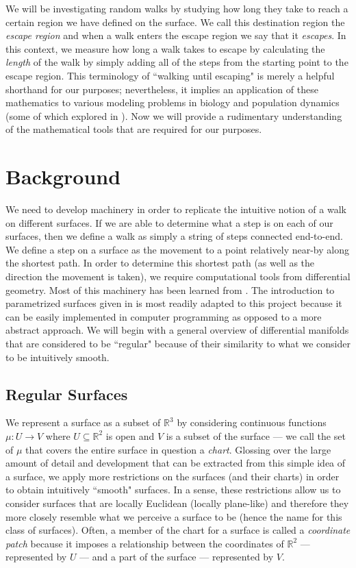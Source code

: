 \documentclass[12pt]{article}
\newcommand{\R}{\mathbb{R}}
\begin{document}
	We will be investigating random walks by studying how long they take to reach a certain region we have defined on the surface.
	We call this destination region the \emph{escape region} and when a walk enters the escape region we say that it \emph{escapes}.
	In this context, we measure how long a walk takes to escape by calculating the \emph{length} of the walk by simply adding all of the steps from the starting point to the escape region.
	This terminology of ``walking until escaping" is merely a helpful shorthand for our purposes; nevertheless, it implies an application of these mathematics to various modeling problems in biology and population dynamics (some of which explored in \cite{Codling_WalksBiology_2008}).
	Now we will provide a rudimentary understanding of the mathematical tools that are required for our purposes.

\section{Background}
	We need to develop machinery in order to replicate the intuitive notion of a walk on different surfaces.
	If we are able to determine what a step is on each of our surfaces, then we define a walk as simply a string of steps connected end-to-end.
	We define a step on a surface as the movement to a point relatively near-by along the shortest path.
	In order to determine this shortest path (as well as the direction the movement is taken), we require computational tools from differential geometry.
	Most of this machinery has been learned from \cite{BanchoffLovett_DiffGeo_2010}.
	The introduction to parametrized surfaces given in \cite{BanchoffLovett_DiffGeo_2010} is most readily adapted to this project because it can be easily implemented in computer programming as opposed to a more abstract approach.
	We will begin with a general overview of differential manifolds that are considered to be ``regular" because of their similarity to what we consider to be intuitively smooth.
	
	\subsection{Regular Surfaces}
		We represent a surface as a subset of $\R^3$ by considering continuous functions $\mu:U \to V$ where $U \subseteq \R^2$ is open and $V$ is a subset of the surface --- we call the set of $\mu$ that covers the entire surface in question a \textit{chart}.
		Glossing over the large amount of detail and development that can be extracted from this simple idea of a surface, we apply more restrictions on the surfaces (and their charts) in order to obtain intuitively ``smooth" surfaces.
		In a sense, these restrictions allow us to consider surfaces that are locally Euclidean (locally plane-like) and therefore they more closely resemble what we perceive a surface to be (hence the name for this class of surfaces).
		Often, a member of the chart for a surface is called a \emph{coordinate patch} because it imposes a relationship between the coordinates of $\R^2$ --- represented by $U$ --- and a part of the surface --- represented by $V$.
		
\end{document}
